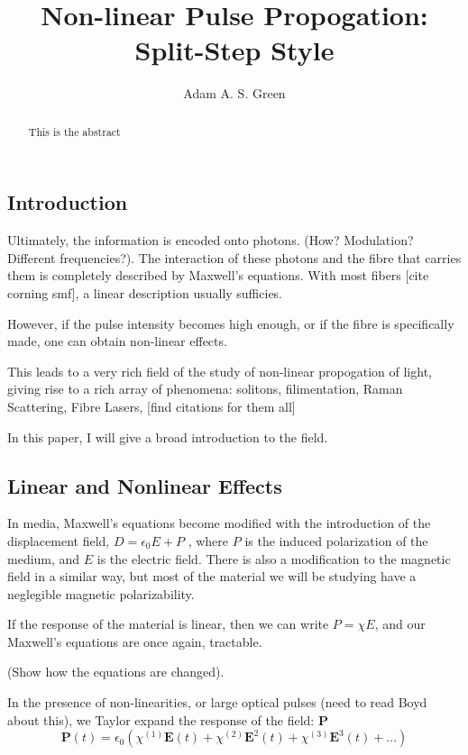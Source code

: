 \documentclass[12pt, titlepage]{article}
\title{Non-linear Pulse Propogation: Split-Step Style}
\author{Adam A. S. Green}
\renewcommand{\v}[1]{\ensuremath{\mathbf{#1}}} %
\begin{document}
\begin{spacing}{1.1}

\maketitle
\begin{abstract}
This is the abstract
\end{abstract}

\section{Introduction}

Ultimately, the information is encoded onto photons. (How? Modulation? Different frequencies?). The interaction
of these photons and the fibre that carries them is completely described by Maxwell's equations. With most
fibers [cite corning smf], a linear description usually sufficies. 

However, if the pulse intensity becomes high enough, or if the fibre is specifically made, one can obtain
non-linear effects. 

This leads to a very rich field of the study of non-linear propogation of light, giving rise to a rich array
of phenomena: solitons, filimentation, Raman Scattering, Fibre Lasers, [find citations for them all]

In this paper, I will give a broad introduction to the field. 

\subsection{Linear and Nonlinear Effects}

In media, Maxwell's equations become modified with the introduction of the displacement field, $D = \epsilon_0 E + P$ , where $P$ is the induced polarization of the medium, and $E$ is the electric field. There is also a 
modification to the magnetic field in a similar way, but most of the material we will be studying have a
neglegible magnetic polarizability.

If the response of the material is linear, then we can write $P = \chi E$, and our Maxwell's equations are
once again, tractable.

(Show how the equations are changed).

In the presence of non-linearities, or large optical pulses (need to read Boyd about this), we Taylor expand
the response of the field:
$\v{P}$
\begin{equation}
\v{P}(t) = \epsilon_0  \left( \chi^{(1)} \v{E}(t) + \chi^{(2)} \v{E}^2(t) + \chi^{(3)} \v{E}^3(t) +...\right)
\end{equation}


\end{spacing}
\end{document}
